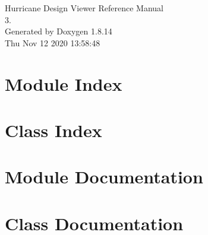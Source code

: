 \documentclass[a4paper]{asimbook}
\begin{document}
   \begin{titlepage}
     \vspace*{7cm}
     \begin{center}
     {\Large Hurricane Design Viewer Reference Manual\\[1ex]\large 3. }\\
     \vspace*{1cm}
     {\large Generated by Doxygen 1.8.14}\\
     \vspace*{0.5cm}
     {\small Thu Nov 12 2020 13:58:48}\\
     \end{center}
   \end{titlepage}

   \clearemptydoublepage

   \tableofcontents
   \clearemptydoublepage

\chapter{Module Index}

\chapter{Class Index}

\chapter{Module Documentation}

\chapter{Class Documentation}








\backmatter
\newpage
{}
\clearemptydoublepage
{}
\printindex
\end{document}
